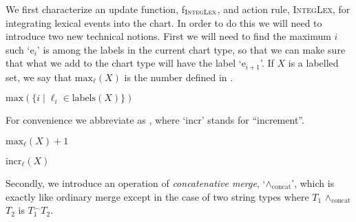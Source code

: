 \begin{ex} 

                         
                       \end{ex}

We first characterize an update function, f$_{\textsc{IntegLex}}$, and
action rule, \textsc{IntegLex}, for integrating lexical events into
the chart.  In order to do this we will need to introduce two new
technical notions.  First we will need to find the maximum $i$ such
`e$_i$' is among the labels in the current chart type, so that we can
make sure that what we add to the chart type will have the label
`e$_{i+1}$'.  If $X$ is a labelled set, we say that $\mathrm{max}_\ell(X)$ is
the number defined in \nexteg{}.
\begin{ex} 
$\mathrm{max}(\{i\mid\ell_i\in\mathrm{labels}(X)\})$ 
\end{ex} 
For convenience we abbreviate  as , where
`$\mathrm{incr}$' stands for ``increment''.
\begin{ex} 
\begin{subex} 
 
\item $\mathrm{max}_\ell(X)+1$ 
 
\item $\mathrm{incr}_\ell(X)$ 
 
\end{subex} 
   
\end{ex} 

Secondly, we introduce an operation of \textit{concatenative merge},
`\d{$\wedge$}$_{\text{concat}}$', which is exactly like ordinary merge
except in the case of two string types where $T_1$
\d{$\wedge$}$_{\text{concat}}$ $T_2$ is $T_1^\frown T_2$.

